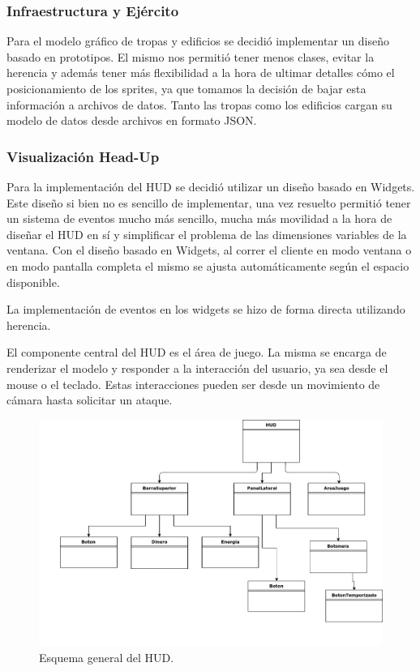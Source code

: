 \documentclass[titlepage,a4paper,12pt]{article}
\begin{document}
\subsubsection{Infraestructura y Ejército}
Para el modelo gráfico de tropas y edificios se decidió implementar un diseño basado en prototipos. El mismo nos permitió tener menos clases, evitar la herencia y además tener más flexibilidad a la hora de ultimar detalles cómo el posicionamiento de los sprites, ya que tomamos la decisión de bajar esta información a archivos de datos. Tanto las tropas como los edificios cargan su modelo de datos desde archivos en formato JSON.

\subsubsection{Visualización Head-Up}
Para la implementación del HUD se decidió utilizar un diseño basado en Widgets. Este diseño si bien no es sencillo de implementar, una vez resuelto permitió tener un sistema de eventos mucho más sencillo, mucha más movilidad a la hora de diseñar el HUD en sí y simplificar el problema de las dimensiones variables de la ventana. Con el diseño basado en Widgets, al correr el cliente en modo ventana o en modo pantalla completa el mismo se ajusta automáticamente según el espacio disponible.

La implementación de eventos en los widgets se hizo de forma directa utilizando herencia.

El componente central del HUD es el área de juego. La misma se encarga de renderizar el modelo y responder a la interacción del usuario, ya sea desde el mouse o el teclado. Estas interacciones pueden ser desde un movimiento de cámara hasta solicitar un ataque.

\begin{figure}[H]
	\centering
	\includegraphics[width=14cm]{../imagenes/cliente-esquema-HUD.jpg}
	\caption{\label{fig:cliente-esquema-HUD} Esquema general del HUD.}
\end{figure}
\end{document}
